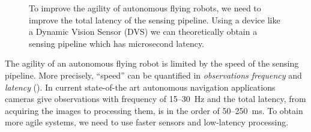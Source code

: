 \begin{figure}[b]
\begin{centering}
\par\end{centering}

\begin{centering}
\par\end{centering}

\caption{\label{fig:Discretization-and-latency}To improve the agility of autonomous
flying robots, we need to improve the total latency of the sensing
pipeline. Using a device like a Dynamic Vision Sensor (DVS) we can
theoretically obtain a sensing pipeline which has microsecond latency.}
\end{figure}


The agility of an autonomous flying robot is limited by the speed
of the sensing pipeline. More precisely, ``speed'' can be quantified
in \emph{observations frequency} and \emph{latency} ().
In current state-of-the art autonomous navigation applications~\cite{Weiss2011}
cameras give observations with frequency of 15--30~Hz and the total
latency, from acquiring the images to processing them, is in the order
of 50--250~ms. To obtain more agile systems, we need to use faster
sensors and low-latency processing.

